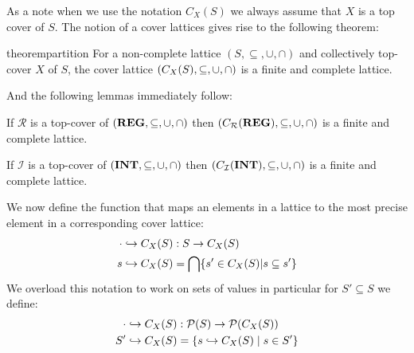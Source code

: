 As a note when we use the notation $C_X(S)$ we always assume that $X$ is a top cover of $S$.
The notion of a cover lattices gives rise to the following theorem:

\begin{restatable}{theorem}{partition}\label{thm:partition}
For a non-complete lattice $(S, \subseteq, \cup, \cap)$ and collectively top-cover $X$ of $S$, the cover lattice $(C_{X}(S), \subseteq, \cup, \cap)$ is a finite and complete lattice.
\end{restatable}

And the following lemmas immediately follow:

\begin{lemma}
    If $\mathcal{R}$ is a top-cover of $(\mathbf{REG}, \subseteq, \cup, \cap)$ then $(C_{\mathcal{R}}(\mathbf{REG}), \subseteq, \cup, \cap)$ is a finite and complete lattice.
\end{lemma}

\begin{lemma}
    If $\mathcal{I}$ is a top-cover of $(\mathbf{INT}, \subseteq, \cup, \cap)$ then $(C_{\mathcal{I}}(\mathbf{INT}), \subseteq, \cup, \cap)$ is a finite and complete lattice.
\end{lemma}

We now define the function that maps an elements in a lattice to the most precise element in a corresponding cover lattice:
\begin{align}
    \cdot \hookrightarrow C_X(S) &: S\rightarrow C_X(S) \\
    s \hookrightarrow C_X(S) &= \bigcap\{s' \in C_X(S)|s \subseteq s'\}
\end{align}
We overload this notation to work on sets of values in particular for $S' \subseteq S$ we define:
\begin{align}
    \cdot \hookrightarrow C_X(S) &: \mathcal{P}(S) \rightarrow \mathcal{P}(C_X(S)) \\
    S' \hookrightarrow C_X (S) &= \{s \hookrightarrow C_X(S) \mid s \in S'\}
\end{align}


%


